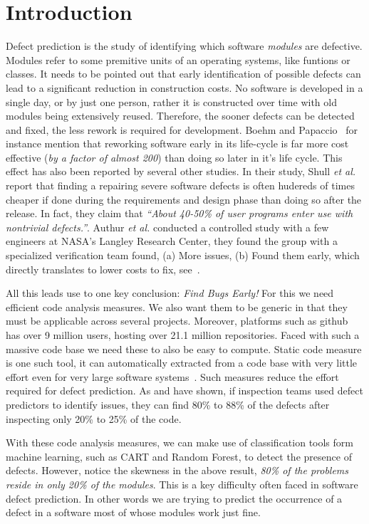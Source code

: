 \documentclass[10pt, journal, compsoc]{IEEEtran}
\begin{document}
\section{Introduction}
Defect prediction is the study of identifying which software \textit{modules} are defective. Modules refer to some premitive units of an operating systems, like funtions or classes. It needs to be pointed out that early identification of possible defects can lead to a significant reduction in construction costs. No software is developed in a single day, or by just one person, rather it is constructed over time with old modules being extensively reused. Therefore, the sooner defects can be detected and fixed, the less rework is required for development. Boehm and Papaccio~\cite{boehm88} for instance mention that reworking software early in its life-cycle is far more cost effective (\textit{by a factor of almost 200}) than doing so later in it's life cycle. This effect has also been reported by several other studies. In their study, Shull \textit{et al.}~\cite{shull2002we} report that finding a repairing severe software defects is often hudereds of times cheaper if done during the requirements and design phase than doing so after the release. In fact, they claim that \textit{``About 40-50\% of user programs enter use with
  nontrivial defects.''}. Authur \textit{et al.} \cite{arthur99} conducted a controlled study with a few engineers at NASA's Langley Research Center, they found the group with a specialized verification team found, (a) More issues, (b) Found them early, which directly translates to lower costs to fix, see~\cite{dabney2006predicting}. 

All this leads use to one key conclusion: \textit{Find Bugs Early!} For this we need efficient code analysis measures. We also want them to be generic in that they must be applicable across several projects. Moreover, platforms such as github has over 9 million users, hosting over 21.1 million repositories. Faced with such a massive code base we need these to also be easy to compute. Static code measure is one such tool, it can automatically extracted from a code base with very little effort even for very large software systems~\cite{nagappan2005static}. Such measures reduce the effort required for defect prediction. As \cite{tosun2010ai} and \cite{ostrand2004bugs} have shown, if inspection teams used defect predictors to identify  issues, they can find 80\% to 88\% of the defects after inspecting only 20\% to 25\% of the code.

With these code analysis measures, we can make use of classification tools form machine learning, such as CART and Random Forest, to detect the presence of defects. However, notice the skewness in the above result, \textit{ 80\% of the problems reside in only 20\% of the modules}. This is a key difficulty often faced in software defect prediction. In other words we are trying to predict the occurrence of a defect in a software most of whose modules work just fine. 
\end{document}
